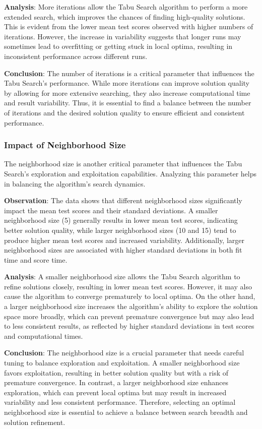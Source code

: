 \documentclass[
]{article}
\begin{document}
    \textbf{Analysis}: More iterations allow the Tabu Search algorithm to perform a more extended search, which improves the chances of finding high-quality solutions. This is evident from the lower mean test scores observed with higher numbers of iterations. However, the increase in variability suggests that longer runs may sometimes lead to overfitting or getting stuck in local optima, resulting in inconsistent performance across different runs.

    \textbf{Conclusion}: The number of iterations is a critical parameter that influences the Tabu Search's performance. While more iterations can improve solution quality by allowing for more extensive searching, they also increase computational time and result variability. Thus, it is essential to find a balance between the number of iterations and the desired solution quality to ensure efficient and consistent performance.

    \subsubsection{Impact of Neighborhood Size}

    The neighborhood size is another critical parameter that influences the Tabu Search’s exploration and exploitation capabilities. Analyzing this parameter helps in balancing the algorithm’s search dynamics.

    \textbf{Observation}: The data shows that different neighborhood sizes significantly impact the mean test scores and their standard deviations. A smaller neighborhood size (5) generally results in lower mean test scores, indicating better solution quality, while larger neighborhood sizes (10 and 15) tend to produce higher mean test scores and increased variability. Additionally, larger neighborhood sizes are associated with higher standard deviations in both fit time and score time.

    \textbf{Analysis}: A smaller neighborhood size allows the Tabu Search algorithm to refine solutions closely, resulting in lower mean test scores. However, it may also cause the algorithm to converge prematurely to local optima. On the other hand, a larger neighborhood size increases the algorithm's ability to explore the solution space more broadly, which can prevent premature convergence but may also lead to less consistent results, as reflected by higher standard deviations in test scores and computational times.

    \textbf{Conclusion}: The neighborhood size is a crucial parameter that needs careful tuning to balance exploration and exploitation. A smaller neighborhood size favors exploitation, resulting in better solution quality but with a risk of premature convergence. In contrast, a larger neighborhood size enhances exploration, which can prevent local optima but may result in increased variability and less consistent performance. Therefore, selecting an optimal neighborhood size is essential to achieve a balance between search breadth and solution refinement.
\end{document}
